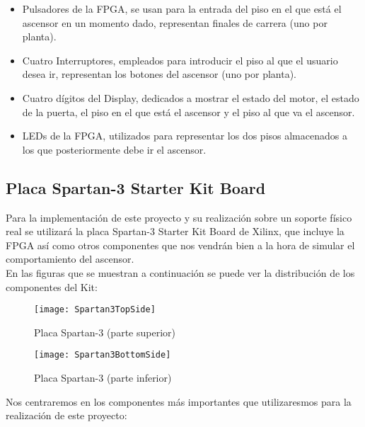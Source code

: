\begin{itemize}
\begin{itemize}
     	   	\item Pulsadores de la FPGA, se usan para la entrada del piso en el que está el ascensor en un momento dado, representan finales de carrera (uno por planta).
    		    \item Cuatro Interruptores, empleados para introducir el piso al que el usuario desea ir, representan los botones del ascensor (uno por planta).
    		    \item Cuatro dígitos del Display, dedicados a mostrar el estado del motor, el estado de la puerta, el piso en el que está el ascensor y el piso al que va el ascensor.
    		    \item LEDs de la FPGA, utilizados para representar los dos pisos almacenados a los que posteriormente debe ir el ascensor.
    	\end{itemize}
	\end{itemize}

\subsection{Placa Spartan-3 Starter Kit Board} \label{subsection:Spartan-3}
    
    Para la implementación de este proyecto y su realización sobre un soporte físico real se utilizará la placa Spartan-3 Starter Kit Board de Xilinx, que incluye la FPGA así como otros componentes que nos vendrán bien a la hora de simular el comportamiento del ascensor. \\ 

    En las figuras que se muestran a continuación se puede ver la distribución de los componentes del Kit:

    \begin{figure}[H]
            \centering
            \texttt{[image: Spartan3TopSide]}
            \caption{Placa Spartan-3 (parte superior)}
            \label{fig:Spartan3TopSide}
    \end{figure}

    \begin{figure}[H]
            \centering
            \texttt{[image: Spartan3BottomSide]}
            \caption{Placa Spartan-3 (parte inferior)}
            \label{fig:Spartan3BottomSide}
    \end{figure}

    Nos centraremos en los componentes más importantes que utilizaresmos para la realización de este proyecto:

